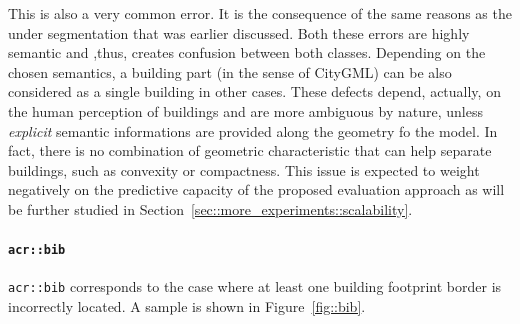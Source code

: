                 This is also a very common error.
                It is the consequence of the same reasons as the under segmentation that was earlier discussed.
                Both these errors are highly semantic and ,thus, creates confusion between both classes.
                Depending on the chosen semantics, a building part (in the sense of CityGML) can be also considered as a single building in other cases.
                These defects depend, actually, on the human perception of buildings and are more ambiguous by nature, unless \textit{explicit} semantic informations are provided along the geometry fo the model.
                In fact, there is no combination of geometric characteristic that can help separate buildings, such as convexity or compactness.
                This issue is expected to weight negatively on the predictive capacity of the proposed evaluation approach as will be further studied in Section~\ref{sec::more_experiments::scalability}.

            \paragraph{\texttt{\acrlong*{acr::bib}}}
                \texttt{\gls{acr::bib}} corresponds to the case where at least one building footprint border is incorrectly located.
                A sample is shown in Figure~\ref{fig::bib}.\\

